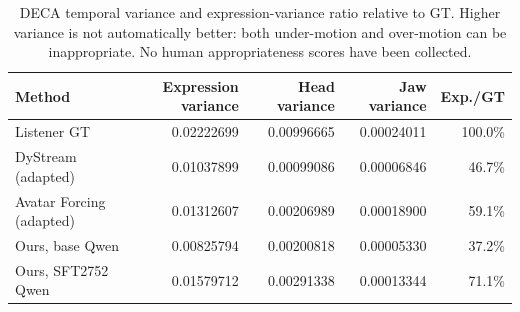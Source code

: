 \begin{table}[t]
\centering\small
\caption{DECA temporal variance and expression-variance ratio relative to GT. Higher variance is not automatically better: both under-motion and over-motion can be inappropriate. No human appropriateness scores have been collected.}
\label{tab:vico43-amplitude}
\setlength{\tabcolsep}{4pt}
\begin{tabular}{lrrrr}
\toprule
Method & Expression variance & Head variance & Jaw variance & Exp./GT \\
\midrule
Listener GT & 0.02222699 & 0.00996665 & 0.00024011 & 100.0\% \\
DyStream (adapted) & 0.01037899 & 0.00099086 & 0.00006846 & 46.7\% \\
Avatar Forcing (adapted) & 0.01312607 & 0.00206989 & 0.00018900 & 59.1\% \\
Ours, base Qwen & 0.00825794 & 0.00200818 & 0.00005330 & 37.2\% \\
Ours, SFT2752 Qwen & 0.01579712 & 0.00291338 & 0.00013344 & 71.1\% \\
\bottomrule
\end{tabular}
\end{table}
